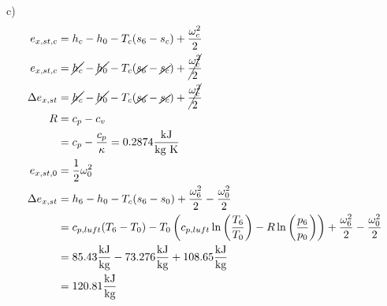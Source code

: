 c)
\begin{align*}
e_{x,st,c} &= h_c - h_0 - T_c(s_6 - s_c) + \frac{\omega_c^2}{2} \\
e_{x,st,c} &= \cancel{h_c} - \cancel{h_0} - T_c(\cancel{s_6} - \cancel{s_c}) + \cancel{\frac{\omega_c^2}{2}} \\
\Delta e_{x,st} &= \cancel{h_c} - \cancel{h_0} - T_c(\cancel{s_6} - \cancel{s_c}) + \cancel{\frac{\omega_c^2}{2}} \\
R &= c_p - c_v \\
&= c_p - \frac{c_p}{\kappa} = 0.2874 \frac{\text{kJ}}{\text{kg K}} \\
e_{x,st,0} &= \frac{1}{2} \omega_0^2 \\
\Delta e_{x,st} &= h_6 - h_0 - T_c(s_6 - s_0) + \frac{\omega_6^2}{2} - \frac{\omega_0^2}{2} \\
&= c_{p,luft}(T_6 - T_0) - T_0 \left( c_{p,luft} \ln \left( \frac{T_6}{T_0} \right) - R \ln \left( \frac{p_6}{p_0} \right) \right) + \frac{\omega_6^2}{2} - \frac{\omega_0^2}{2} \\
&= 85.43 \frac{\text{kJ}}{\text{kg}} - 73.276 \frac{\text{kJ}}{\text{kg}} + 108.65 \frac{\text{kJ}}{\text{kg}} \\
&= 120.81 \frac{\text{kJ}}{\text{kg}}
\end{align*}